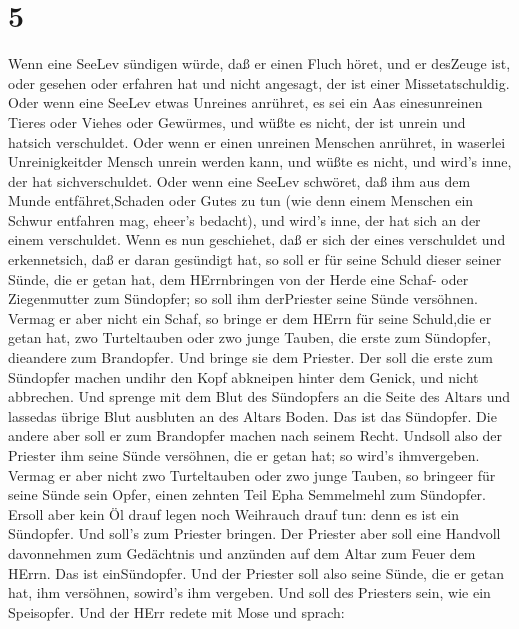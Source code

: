 \hypertarget{section-4}{%
\section{5}\label{section-4}}

 Wenn eine SeeLev sündigen würde, daß er einen Fluch höret,
und er desZeuge ist, oder gesehen oder erfahren hat und nicht angesagt,
der ist einer Missetatschuldig.  Oder wenn eine SeeLev etwas
Unreines anrühret, es sei ein Aas einesunreinen Tieres oder Viehes oder
Gewürmes, und wüßte es nicht, der ist unrein und hatsich verschuldet.
 Oder wenn er einen unreinen Menschen anrühret, in waserlei
Unreinigkeitder Mensch unrein werden kann, und wüßte es nicht, und
wird's inne, der hat sichverschuldet.  Oder wenn eine SeeLev
schwöret, daß ihm aus dem Munde entfähret,Schaden oder Gutes zu tun (wie
denn einem Menschen ein Schwur entfahren mag, eheer's bedacht), und
wird's inne, der hat sich an der einem verschuldet.  Wenn es
nun geschiehet, daß er sich der eines verschuldet und erkennetsich, daß
er daran gesündigt hat,  so soll er für seine Schuld dieser
seiner Sünde, die er getan hat, dem HErrnbringen von der Herde eine
Schaf- oder Ziegenmutter zum Sündopfer; so soll ihm derPriester seine
Sünde versöhnen.  Vermag er aber nicht ein Schaf, so bringe
er dem HErrn für seine Schuld,die er getan hat, zwo Turteltauben oder
zwo junge Tauben, die erste zum Sündopfer, dieandere zum Brandopfer.
 Und bringe sie dem Priester. Der soll die erste zum
Sündopfer machen undihr den Kopf abkneipen hinter dem Genick, und nicht
abbrechen.  Und sprenge mit dem Blut des Sündopfers an die
Seite des Altars und lassedas übrige Blut ausbluten an des Altars Boden.
Das ist das Sündopfer.  Die andere aber soll er zum
Brandopfer machen nach seinem Recht. Undsoll also der Priester ihm seine
Sünde versöhnen, die er getan hat; so wird's ihmvergeben. 
Vermag er aber nicht zwo Turteltauben oder zwo junge Tauben, so bringeer
für seine Sünde sein Opfer, einen zehnten Teil Epha Semmelmehl zum
Sündopfer. Ersoll aber kein Öl drauf legen noch Weihrauch drauf tun:
denn es ist ein Sündopfer.  Und soll's zum Priester
bringen. Der Priester aber soll eine Handvoll davonnehmen zum Gedächtnis
und anzünden auf dem Altar zum Feuer dem HErrn. Das ist einSündopfer.
 Und der Priester soll also seine Sünde, die er getan hat,
ihm versöhnen, sowird's ihm vergeben. Und soll des Priesters sein, wie
ein Speisopfer.  Und der HErr redete mit Mose und sprach:
